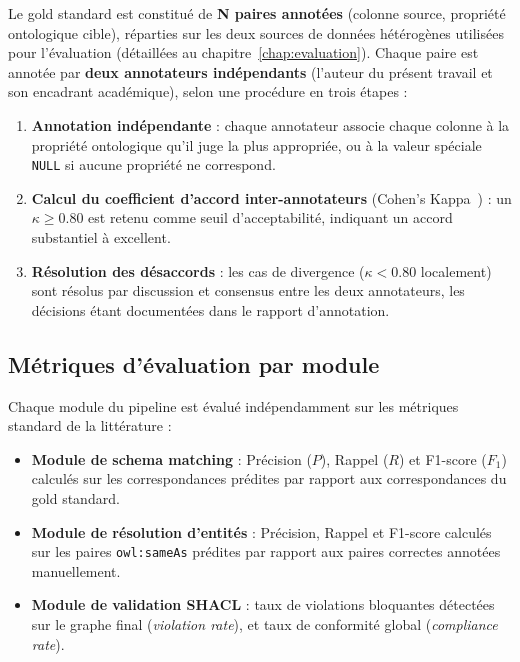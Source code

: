 Le gold standard est constitué de \textbf{N paires annotées}
(colonne source, propriété ontologique cible), réparties sur les
deux sources de données hétérogènes utilisées pour l'évaluation
(détaillées au chapitre~\ref{chap:evaluation}).
Chaque paire est annotée par \textbf{deux annotateurs indépendants}
(l'auteur du présent travail et son encadrant académique),
selon une procédure en trois étapes :
\begin{enumerate}
    \item \textbf{Annotation indépendante} :
          chaque annotateur associe chaque colonne à la propriété
          ontologique qu'il juge la plus appropriée, ou à la valeur
          spéciale \texttt{NULL} si aucune propriété ne correspond.
    \item \textbf{Calcul du coefficient d'accord inter-annotateurs}
          (Cohen's Kappa~\cite{cohen1960kappa}) :
          un $\kappa \geq 0.80$ est retenu comme seuil d'acceptabilité,
          indiquant un accord substantiel à excellent.
    \item \textbf{Résolution des désaccords} :
          les cas de divergence ($\kappa < 0.80$ localement) sont
          résolus par discussion et consensus entre les deux
          annotateurs, les décisions étant documentées dans le
          rapport d'annotation.
\end{enumerate}

\subsection{Métriques d'évaluation par module}

Chaque module du pipeline est évalué indépendamment
sur les métriques standard de la littérature :
\begin{itemize}
    \item \textbf{Module de schema matching} :
          Précision ($P$), Rappel ($R$) et F1-score ($F_1$)
          calculés sur les correspondances prédites par rapport
          aux correspondances du gold standard.
    \item \textbf{Module de résolution d'entités} :
          Précision, Rappel et F1-score calculés sur les paires
          \texttt{owl:sameAs} prédites par rapport aux paires
          correctes annotées manuellement.
    \item \textbf{Module de validation SHACL} :
          taux de violations bloquantes détectées sur le graphe
          final (\textit{violation rate}), et taux de conformité
          global (\textit{compliance rate}).
\end{itemize}

